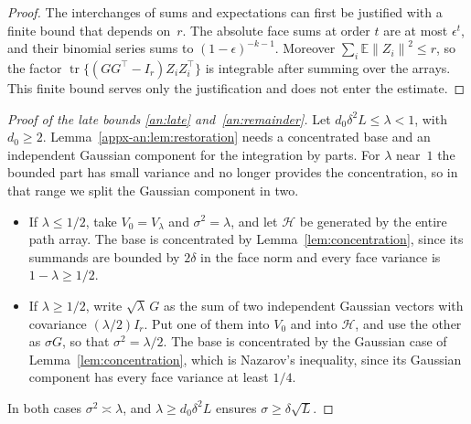 \documentclass[11pt,letterpaper]{article}
\newif\ifshowrev
\newenvironment{revblock}{\ifshowrev\color{revblue}%
\hypersetup{linkcolor=revblue,citecolor=revblue,urlcolor=revblue}\fi}{}
\newif\ifshowtrim
\newcommand{\trim}[1]{\ifshowtrim{\color{revblue}%
\hypersetup{linkcolor=revblue,citecolor=revblue,urlcolor=revblue}#1}\else#1\fi}
\newif\ifshowskill
\newcommand{\sks}[1]{\ifshowskill{\color{revblue}#1}\else#1\fi}
\theoremstyle{remark}
\newcommand{\E}{\mathbb E}
\newcommand{\tr}{\operatorname{tr}}
\newcommand{\norm}[1]{\left\lVert#1\right\rVert}
\begin{document}
\begin{revblock}
\begin{proof}
The interchanges of sums and expectations can first be justified with a
finite bound that depends on~\(r\). The absolute face sums at order
\(\sks{t}\) are at most \(\epsilon^{\sks{t}}\), and their binomial series sums to
\((1-\epsilon)^{-k-1}\). Moreover \(\sum_i\E\norm{Z_i}^2\le r\), so the
\trim{factor \(\tr\{(GG^\top-I_r)Z_iZ_i^\top\}\)} is integrable after summing over the arrays. This finite
bound serves only the justification and does not enter the estimate.
\end{proof}

\begin{proof}[Proof of the late bounds \eqref{an:late}
and~\eqref{an:remainder}]
Let \(d_0\delta^2L\le\lambda<1\), with \(d_0\ge2\).
Lemma~\ref{appx-an:lem:restoration} needs a concentrated base and an
independent Gaussian component for the integration by parts. For
\(\lambda\) near~\(1\) the bounded part has small variance and no longer
provides the concentration, so in that range we split the Gaussian
component in two.
\begin{itemize}
\item If \(\lambda\le1/2\), take \(V_0=V_\lambda\) and
\(\sigma^2=\lambda\), and let \(\mathcal H\) be generated by the entire
path array. The base is concentrated by Lemma~\ref{lem:concentration},
since its summands are bounded by \(2\delta\) in the face norm and every
face variance is \(1-\lambda\ge1/2\).
\item If \(\lambda\ge1/2\), write \(\sqrt\lambda\,G\) as the sum of two
independent Gaussian vectors with covariance \((\lambda/2)I_r\). Put one
of them into \(V_0\) and into \(\mathcal H\), and use the other as
\(\sigma G\), so that \(\sigma^2=\lambda/2\). The base is concentrated
by the Gaussian case of Lemma~\ref{lem:concentration}\trim{, which is
Nazarov's inequality}, since its Gaussian
component has every face variance at least \(1/4\).
\end{itemize}
In both cases \(\sigma^2\asymp\lambda\), and \(\lambda\ge d_0\delta^2L\)
ensures \(\sigma\ge\delta\sqrt L\).


\end{proof}
\end{revblock}
\end{document}
